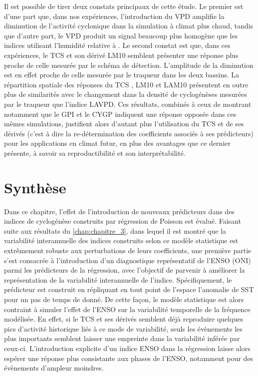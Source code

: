 \documentclass[../main.tex]{subfiles}
\begin{document}
Il est possible de tirer deux constats principaux de cette étude. Le premier est d'une part que, dans nos expériences, l'introduction du VPD amplifie la
diminution de l'activité cyclonique dans la simulation à climat plus chaud, tandis que d'autre part, le VPD produit un signal beaucoup plus homogène que les
indices utilisant l'humidité relative à . Le second constat est que, dans ces expériences, le TCS et son dérivé LM10 semblent présenter une réponse
plus proche de celle mesurée par le schéma de détection. L'amplitude de la diminution est en effet proche de celle mesurée par le traqueur dans les deux
bassins. La répartition spatiale des réponses du TCS , LM10 et LAM10 présentent en outre plus de similarités avec le changement dans la densité de cyclogénèses
mesurées par le traqueur que l'indice LAVPD. Ces résultats, combinés à ceux de \textcite{cattiaux_projected_2020,chauvin_future_2020} montrant notamment que le
GPI et le CYGP indiquent une réponse opposée dans ces mêmes simulations, justifient alors d'autant plus l'utilisation du TCS et de ses dérivés (c'est à dire la
re-détermination des coefficients associés à ses prédicteurs) pour les applications en climat futur, en plus des avantages que ce dernier présente, à savoir sa
reproductibilité et son interprétabilité.

\section{Synthèse}

Dans ce chapitre, l'effet de l'introduction de nouveaux prédicteurs dans des indices de cyclogénèse construits par régression de Poisson est évalué. Faisant
suite aux résultats du \cref{chap:chapitre_3}, dans lequel il est montré que la variabilité interannuelle des indices construits selon ce modèle statistique est
extrêmement robuste aux perturbations de leurs coefficients, une première partie s'est consacrée à l'introduction d'un diagnostique représentatif de l'ENSO
(ONI) parmi les prédicteurs de la régression, avec l'objectif de parvenir à améliorer la représentation de la variabilité interannuelle de l'indice.
Spécifiquement, le prédicteur est construit en répliquant en tout point de l'espace l'anomalie de SST pour un pas de temps de donné. De cette façon, le modèle
statistique est alors contraint à simuler l'effet de l'ENSO sur la variabilité temporelle de la fréquence modélisée. En effet, si le TCS et ses dérivés semblent
déjà reproduire quelques pics d'activité historique liés à ce mode de variabilité, seuls les évènements les plus importants semblent laisser une empreinte dans
la variabilité inférée par ceux-ci. L'introduction explicite d'un indice ENSO dans la régression laisse alors espérer une réponse plus consistante aux phases de
l'ENSO, notamment pour des évènements d'ampleur moindres.
\end{document}

